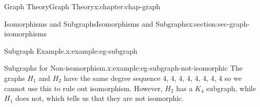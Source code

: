 \documentclass[oneside,10pt,]{book}
\numberwithin{equation}{section}
\begin{document}
\begin{chapterptx}{Graph Theory}{}{Graph Theory}{}{}{x:chapter:chap-graph}
\begin{sectionptx}{Isomorphisms and Subgraphs}{}{Isomorphisms and Subgraphs}{}{}{x:section:sec-graph-isomorphisms}
\begin{example}{Subgraph Example.}{x:example:eg-subgraph}
\begin{sidebyside}{1}{0.375}{0.375}{0}
\begin{sbspanel}{0.25}
{
}%
\end{sbspanel}%
\end{sidebyside}%
\end{example}
\begin{example}{Subgraphs for Non-isomorphism.}{x:example:eg-subgraph-not-isomorphic}%
The graphs \(H_1\) and \(H_2\) have the same degree sequence 4, 4, 4, 4, 4, 4, 4, 4 so we cannot use this to rule out isomorphism. However, \(H_2\) has a \(K_4\) subgraph, while \(H_1\) does not, which tells us that they are not isomorphic.%
\begin{sidebyside}{3}{0.0583333333333333}{0.0583333333333333}{0.116666666666667}%
\begin{sbspanel}{0.2}%
\end{sbspanel}
\end{sidebyside}
\end{example}
\end{sectionptx}
\end{chapterptx}
\end{document}

